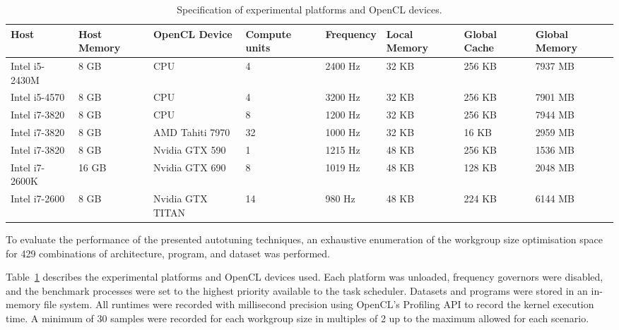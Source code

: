 \documentclass[preprint,nonatbib,10pt]{sigplanconf}
\begin{document}
\begin{table}
\scriptsize
\centering
\begin{tabular}{l l | l l l l l l}
\toprule
Host & Host Memory &  OpenCL Device &  Compute units & Frequency & Local Memory & Global Cache & Global Memory \\
\midrule
Intel i5-2430M & 8 GB  & CPU              &              4 &   2400 Hz &        32 KB &       256 KB &       7937 MB \\
Intel i5-4570  & 8 GB  & CPU              &              4 &   3200 Hz &        32 KB &       256 KB &       7901 MB \\
Intel i7-3820  & 8 GB  & CPU              &              8 &   1200 Hz &        32 KB &       256 KB &       7944 MB \\
Intel i7-3820  & 8 GB  & AMD Tahiti 7970  &             32 &   1000 Hz &        32 KB &        16 KB &       2959 MB \\
Intel i7-3820  & 8 GB  & Nvidia GTX 590   &              1 &   1215 Hz &        48 KB &       256 KB &       1536 MB \\
Intel i7-2600K & 16 GB & Nvidia GTX 690   &              8 &   1019 Hz &        48 KB &       128 KB &       2048 MB \\
Intel i7-2600  & 8 GB  & Nvidia GTX TITAN &             14 &    980 Hz &        48 KB &       224 KB &       6144 MB \\
\bottomrule
\end{tabular}
\caption{Specification of experimental platforms and OpenCL devices.}
\label{tab:hw}
\end{table}

To evaluate the performance of the presented autotuning techniques, an
exhaustive enumeration of the workgroup size optimisation space for
429 combinations of architecture, program, and dataset was performed.

Table~\ref{tab:hw} describes the experimental platforms and OpenCL
devices used. Each platform was unloaded, frequency governors were
disabled, and the benchmark processes were set to the highest priority
available to the task scheduler. Datasets and programs were stored in
an in-memory file system. All runtimes were recorded with millisecond
precision using OpenCL's Profiling API to record the kernel execution
time. A minimum of 30 samples were recorded for each workgroup size in
multiples of 2 up to the maximum allowed for each scenario.
\end{document}
